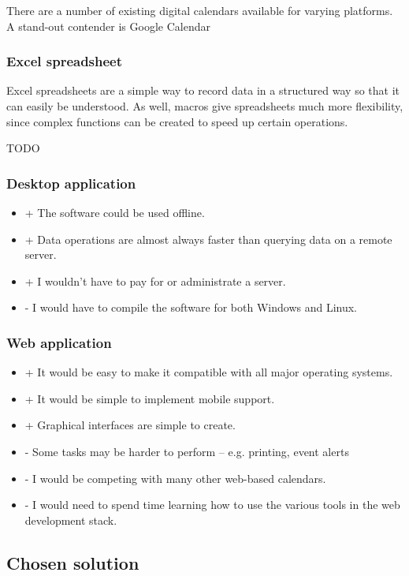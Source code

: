 There are a number of existing digital calendars available for varying
platforms. A stand-out contender is Google Calendar


\subsubsection{Excel spreadsheet}

Excel spreadsheets are a simple way to record data in a structured way so that
it can easily be understood. As well, macros give spreadsheets much more
flexibility, since complex functions can be created to speed up certain
operations.

TODO


\subsubsection{Desktop application}

\begin{itemize}
  \item + The software could be used offline.
  \item + Data operations are almost always faster than querying data on a
          remote server.
  \item + I wouldn't have to pay for or administrate a server.
  \item - I would have to compile the software for both Windows and Linux.
\end{itemize}



\subsubsection{Web application}

\begin{itemize}
  \item + It would be easy to make it compatible with all major operating
          systems.
  \item + It would be simple to implement mobile support.
  \item + Graphical interfaces are simple to create.
  \item - Some tasks may be harder to perform -- e.g. printing, event alerts
  \item - I would be competing with many other web-based calendars.
  \item - I would need to spend time learning how to use the various tools in
          the web development stack.
\end{itemize}


\subsection{Chosen solution}


